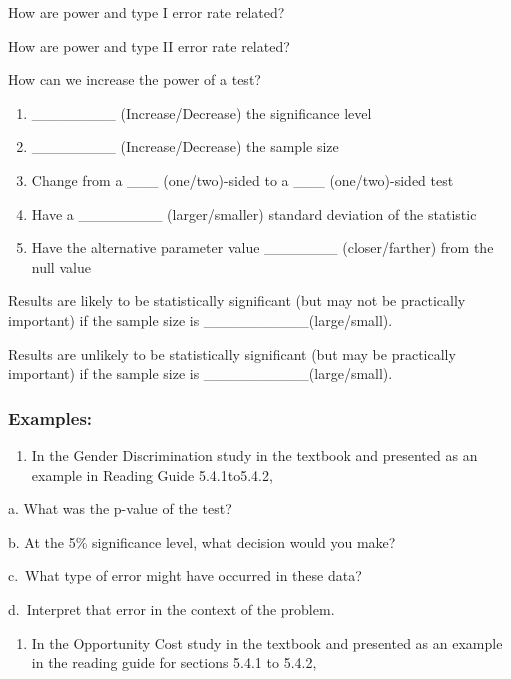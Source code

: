 \documentclass[
]{report}
\providecommand{\tightlist}{%
  \setlength{\itemsep}{0pt}\setlength{\parskip}{0pt}}
\newcommand{\rgs}{\vspace{12pt}} %
\newcommand{\rgi}{\hspace{24pt}}  %
\begin{document}
How are power and type I error rate related?
\rgs

How are power and type II error rate related?
\rgs

How can we increase the power of a test?

\begin{enumerate}
\def\labelenumi{\arabic{enumi}.}
\item
  \_\_\_\_\_\_\_\_ (Increase/Decrease) the significance level
  \rgs
\item
  \_\_\_\_\_\_\_\_ (Increase/Decrease) the sample size
  \rgs
\item
  Change from a \_\_\_ (one/two)-sided to a \_\_\_ (one/two)-sided test
  \rgs
\item
  Have a \_\_\_\_\_\_\_\_ (larger/smaller) standard deviation of the statistic
  \rgs
\item
  Have the alternative parameter value \_\_\_\_\_\_\_ (closer/farther) from the null value
  \rgs
\end{enumerate}

Results are likely to be statistically significant (but may not be practically important) if the sample size is \_\_\_\_\_\_\_\_\_\_(large/small).
\rgs

Results are unlikely to be statistically significant (but may be practically important) if the sample size is \_\_\_\_\_\_\_\_\_\_(large/small).
\rgs

\hypertarget{examples}{%
\subsubsection*{Examples:}\label{examples}}

\begin{enumerate}
\def\labelenumi{\arabic{enumi}.}
\tightlist
\item
  In the Gender Discrimination study in the textbook and presented as an example in Reading Guide 5.4.1to5.4.2,
\end{enumerate}

\rgi a. What was the p-value of the test?
\rgs

\rgi b. At the 5\% significance level, what decision would you make?
\rgs

\rgi c.~What type of error might have occurred in these data?
\rgs

\rgi d.~Interpret that error in the context of the problem.
\rgs
\rgs

\begin{enumerate}
\def\labelenumi{\arabic{enumi}.}
\setcounter{enumi}{1}
\tightlist
\item
  In the Opportunity Cost study in the textbook and presented as an example in the reading guide for sections 5.4.1 to 5.4.2,
\end{enumerate}
\end{document}
